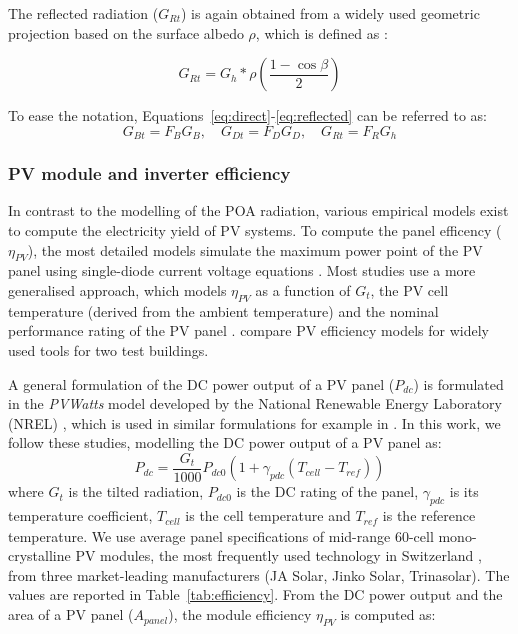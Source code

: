 The reflected radiation ($G_{Rt}$) is again obtained from a widely used geometric projection based on the surface albedo $\rho$, which is defined as \cite{duffie_solar_2013}:

\begin{equation}
\label{eq:reflected}
G_{Rt} = G_h * \rho \left( \frac{1-\cos \beta}{2} \right)
\end{equation}

To ease the notation, Equations~\ref{eq:direct}-\ref{eq:reflected} can be referred to as:
\begin{equation}
\label{eq:tilted_irrad_simplified}
G_{Bt} = F_B G_B, \quad G_{Dt} = F_D G_D, \quad G_{Rt} = F_R G_h
\end{equation}



\subsubsection{PV module and inverter efficiency}
\label{app:efficiency}

In contrast to the modelling of the POA radiation, various empirical models exist to compute the electricity yield of PV systems. 
To compute the panel efficency ($\eta_{PV}$), the most detailed models simulate the maximum power point of the PV panel using single-diode current voltage equations \cite{strzalka_large_2012,buffat_scalable_2018}.
Most studies use a more generalised approach, which models $\eta_{PV}$ as a function of $G_t$, the PV cell temperature (derived from the ambient temperature) and the nominal performance rating of the PV panel \cite{jakubiec_method_2013,calcabrini_simplified_2019,singh_estimation_2015,ramirez_camargo_spatio-temporal_2015,mainzer_assessment_2017}. \citet{jakubiec_method_2013} compare PV efficiency models for widely used tools for two test buildings.

A general formulation of the DC power output of a PV panel ($P_{dc}$) is formulated in the \textit{PVWatts} model developed by the National Renewable Energy Laboratory (NREL) \cite{dobos_pvwatts_2014}, which is used in similar formulations for example in \cite{jakubiec_method_2013,ramirez_camargo_spatio-temporal_2015,singh_estimation_2015,calcabrini_simplified_2019}. 
In this work, we follow these studies, modelling the DC power output of a PV panel as:
\begin{equation}
\label{eq:Pdc}
    P_{dc} = \frac{G_{t}}{1000} P_{dc0} (1 + \gamma_\mathit{pdc}(T_\mathit{cell}-T_\mathit{ref}))
\end{equation}
where $G_t$ is the tilted radiation, $P_{dc0}$ is the DC rating of the panel,  $\gamma_\mathit{pdc}$ is its temperature coefficient, $T_\mathit{cell}$ is the cell temperature and $T_\mathit{ref}$ is the reference temperature.
%
We use average panel specifications of mid-range 60-cell mono-crystalline PV modules, the most frequently used technology in Switzerland \cite{buffat_scalable_2018}, from three market-leading manufacturers (JA Solar, Jinko Solar, Trinasolar). The values are reported in Table~\ref{tab:efficiency}.
%
From the DC power output and the area of a PV panel ($A_\mathit{panel}$), the module efficiency $\eta_{PV}$ is computed as:

